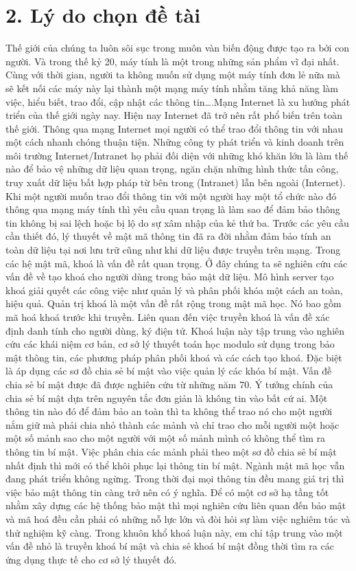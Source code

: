 \documentclass[12pt,a4paper]{report}
\begin{document}
\section*{2. Lý do chọn đề tài}
Thế giới của chúng ta luôn sôi sục trong muôn vàn biến động được tạo ra bởi con người. Và trong thế kỷ 20, máy tính là một trong những sản phẩm vĩ đại nhất. Cùng với thời gian, người ta không muốn sử dụng một máy tính đơn lẻ nữa mà sẽ kết nối các máy này lại thành một mạng máy tính nhằm tăng khả năng làm việc, hiểu biết, trao đổi, cập nhật các thông tin….Mạng Internet là xu hướng phát triển của thế giới ngày nay. Hiện nay Internet đã trở nên rất phổ biến trên toàn thế giới. Thông qua mạng Internet  mọi người có thể trao đổi thông tin với nhau một cách nhanh chóng thuận tiện. Những công ty phát triển và kinh doanh trên môi trường Internet/Intranet họ phải đối diện với những khó khăn lớn là làm thế nào để bảo vệ những dữ liệu quan trọng, ngăn chặn những hình thức tấn công, truy xuất dữ liệu bất hợp pháp từ bên trong (Intranet) lẫn bên ngoài (Internet). Khi một người muốn trao đổi thông tin với một người hay một tổ chức nào đó thông qua mạng máy tính thì yêu cầu quan trọng là làm sao để đảm bảo thông tin không bị sai lệch hoặc bị lộ do sự xâm nhập của kẻ thứ ba. Trước các yêu cầu cần thiết đó, lý thuyết về mật mã thông tin đã ra đời nhằm đảm bảo tính an toàn dữ liệu tại nơi lưu trữ cũng như khi dữ liệu được truyền trên mạng. 
Trong các hệ mật mã, khoá là vấn đề rất quan trọng. Ở đây chúng ta sẽ nghiên cứu các vấn đề về tạo khoá cho người dùng trong bảo mật dữ liệu. Mô hình server tạo khoá giải quyết các công việc như quản lý và phân phối khóa một cách an toàn, hiệu quả. Quản trị khoá là một vấn đề rất rộng trong mật mã học. Nó bao gồm mã hoá khoá trước khi truyền. Liên quan đến việc truyền khoá là vấn đề xác định danh tính cho người dùng, ký điện tử. 
Khoá luận này tập trung vào nghiên cứu các khái niệm cơ bản, cơ sở lý thuyết toán học modulo sử dụng trong bảo mật thông tin, các phương pháp phân phối khoá và các cách tạo khoá. Đặc biệt là áp dụng các sơ đồ chia sẻ bí mật vào việc quản lý các khóa bí mật.
Vấn đề chia sẻ bí mật được đã được nghiên cứu từ những năm 70. Ý tưởng chính của chia sẻ bí mật dựa trên nguyên tắc đơn giản là không tin vào bất cứ ai. Một thông tin nào đó để đảm bảo an toàn thì ta không thể trao nó cho một người nắm giữ mà phải chia nhỏ thành các mảnh và chỉ trao cho mỗi người một hoặc một số mảnh sao cho một người với một số mảnh mình có không thể tìm ra thông tin bí mật. Việc phân chia các mảnh phải theo một sơ đồ chia sẻ bí mật nhất định thì mới có thể khôi phục lại thông tin bí mật. 
Ngành mật mã học vẫn đang phát triển không ngừng. Trong thời đại mọi thông tin đều mang giá trị thì việc bảo mật thông tin càng trở nên có ý nghĩa. Để có một cơ sở hạ tầng tốt nhằm xây dựng các hệ thống bảo mật thì mọi nghiên cứu liên quan đến bảo mật và mã hoá đều cần phải có những nỗ lực lớn và đòi hỏi sự làm việc nghiêm túc và thử nghiệm kỹ càng. Trong khuôn khổ khoá luận này, em chỉ tập trung vào một vấn đề nhỏ là truyền khoá bí mật và chia sẻ khoá bí mật đồng thời tìm ra các ứng dụng thực tế cho cơ sở lý thuyết đó.
\end{document}
